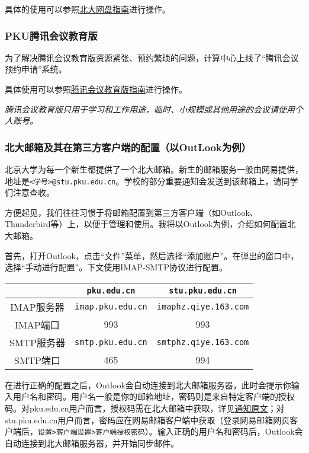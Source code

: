 \documentclass[../main.tex]{subfiles}
\begin{document}
具体的使用可以参照\href{https://its.pku.edu.cn/service_1_webdisk.jsp}{北大网盘指南}进行操作。

\subsubsection{PKU腾讯会议教育版}

为了解决腾讯会议教育版资源紧张、预约繁琐的问题，计算中心上线了“腾讯会议预约申请”系统。

具体使用可以参照\href{https://its.pku.edu.cn/service_1_webex.jsp}{腾讯会议教育版指南}进行操作。

\emph{腾讯会议教育版只用于学习和工作用途，临时、小规模或其他用途的会议请使用个人账号。}

\subsubsection{北大邮箱及其在第三方客户端的配置（以OutLook为例）}

北京大学为每一个新生都提供了一个北大邮箱。新生的邮箱服务一般由网易提供，地址是\texttt{<学号>@stu.pku.edu.cn}。学校的部分重要通知会发送到该邮箱上，请同学们注意查收。

方便起见，我们往往习惯于将邮箱配置到第三方客户端（如Outlook、Thunderbird等）上，以便于管理和使用。我将以Outlook为例，介绍如何配置北大邮箱。

首先，打开Outlook，点击“文件”菜单，然后选择“添加账户”。在弹出的窗口中，选择“手动进行配置”。下文使用IMAP-SMTP协议进行配置。

\begin{table}[ht]
  \centering
  \begin{tabular}{c|c|c}
    \hline
    & \texttt{pku.edu.cn} & \texttt{stu.pku.edu.cn} \\
    \hline
    IMAP服务器 & \texttt{imap.pku.edu.cn} & \texttt{imaphz.qiye.163.com} \\
    IMAP端口 & 993 & 993 \\
    \hline
    SMTP服务器 & \texttt{smtp.pku.edu.cn} & \texttt{smtphz.qiye.163.com} \\
    SMTP端口 & 465 & 994 \\
    \hline
  \end{tabular}
\end{table}

在进行正确的配置之后，Outlook会自动连接到北大邮箱服务器，此时会提示你输入用户名和密码。用户名一般是你的邮箱地址，密码则是来自特定客户端的授权码。对pku.edu.cn用户而言，授权码需在北大邮箱中获取，详见\href{https://its.pku.edu.cn/announce/tz20250702100126.jsp}{通知原文}；对stu.pku.edu.cn用户而言，密码应在网易邮箱客户端中获取（登录网易邮箱网页客户端后，\texttt{设置>客户端设置>客户端授权密码}）。输入正确的用户名和密码后，Outlook会自动连接到北大邮箱服务器，并开始同步邮件。
\end{document}

